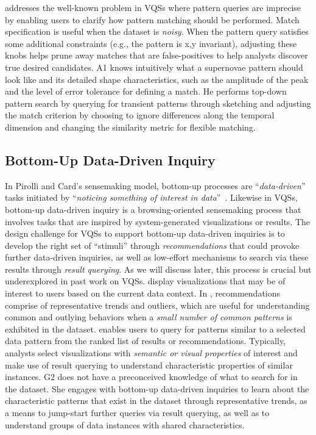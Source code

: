     addresses the well-known problem in VQSs where pattern queries are imprecise~\cite{correll2016semantics,Holz2009,Eichmann2015} by enabling users to clarify how pattern matching should be performed. Match specification is useful when the dataset is \emph{noisy}. When the pattern query satisfies some additional constraints (e.g., the pattern is x,y invariant), adjusting these knobs helps prune away matches that are false-positives to help analysts discover true desired candidates.
    A1 knows intuitively what a supernovae pattern should look like and its detailed shape characteristics, such as the amplitude of the peak and the level of error tolerance for defining a match. He performs top-down pattern search by querying for transient patterns through sketching and adjusting the match criterion by choosing to ignore differences along the temporal dimension and changing the similarity metric for flexible matching.
   \subsection{Bottom-Up Data-Driven Inquiry}%
   In Pirolli and Card's sensemaking model, bottom-up processes are ``\textit{data-driven}'' tasks initiated by ``\textit{noticing something of interest in data}''~\cite{Pirolli}. Likewise in VQSs, bottom-up data-driven inquiry is a browsing-oriented sensemaking process that involves tasks that are inspired by system-generated visualizations or results. The design challenge for VQSs to support bottom-up data-driven inquiries is to develop the right set of ``stimuli'' through \textit{recommendations} that could provoke further data-driven inquiries, as well as low-effort mechanisms to search via these results through \textit{result querying}. As we will discuss later, this process is crucial but underexplored in past work on VQSs. %
    display visualizations that may be of interest to users based on the current data context. In \zvpp, recommendations comprise of representative trends and outliers, which are useful for understanding common and outlying behaviors when a \emph{small number of common patterns} is exhibited in the dataset. %
    enables users to query for patterns similar to a selected data pattern from the ranked list of results or recommendations. Typically, analysts select visualizations with \emph{semantic or visual properties} of interest and make use of result querying to understand characteristic properties of similar instances.
    G2 does not have a preconceived knowledge of what to search for in the dataset. She engages with bottom-up data-driven inquiries to learn about the characteristic patterns that exist in the dataset through representative trends, as a means to jump-start further queries via result querying, as well as to understand groups of data instances with shared characteristics.
